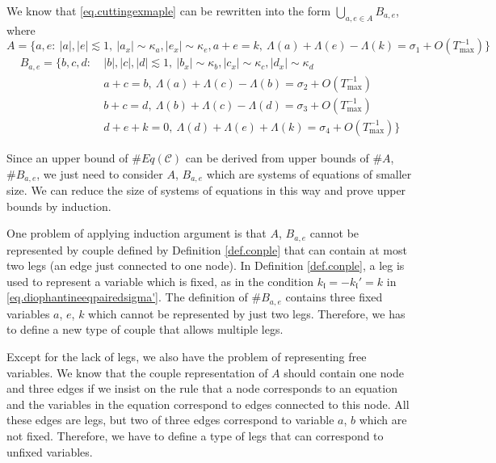 We know that \eqref{eq.cuttingexmaple} can be rewritten into the form $\bigcup_{a,e\in A} B_{a,e}$, where
\begin{equation}\label{eq.couplequationA}
    A=\{a, e:\ |a|,|e|\lesssim 1,\ |a_x|\sim \kappa_{a},|e_x|\sim \kappa_{e}, a+e=k,\ \Lambda(a) + \Lambda(e) - \Lambda(k) =\sigma_{1} + O(T^{-1}_{\text{max}})\}
\end{equation}
\begin{equation}\label{eq.couplequationB}
    \begin{split}
        B_{a,e}=\{b, c, d:\ &|b|,|c|,|d|\lesssim 1,\ |b_x|\sim \kappa_{b},|c_x|\sim \kappa_{c},|d_x|\sim \kappa_{d}
        \\
        &a+c=b,\ \Lambda(a) + \Lambda(c) - \Lambda(b) =\sigma_{2} + O(T^{-1}_{\text{max}})
        \\
        &b+c=d,\ \Lambda(b) + \Lambda(c) - \Lambda(d) =\sigma_{3} + O(T^{-1}_{\text{max}})
        \\
        &d+e+k=0,\ \Lambda(d) + \Lambda(e) + \Lambda(k) =\sigma_{4} + O(T^{-1}_{\text{max}})\}
    \end{split}    
\end{equation}

Since an upper bound of $\# Eq(\mathcal{C})$ can be derived from upper bounds of $\# A$, $\# B_{a,e}$, we just need to consider $A$, $B_{a,e}$ which are systems of equations of smaller size. We can reduce the size of systems of equations in this way and prove upper bounds by induction.

One problem of applying induction argument is that $A$, $B_{a,e}$ cannot be represented by couple defined by Definition \ref{def.conple} that can contain at most two legs (an edge just connected to one node). In Definition \ref{def.conple}, a leg is used to represent a variable which is fixed, as in the condition $k_{\mathfrak{l}} = - k_{\mathfrak{l}}'= k$ in \eqref{eq.diophantineeqpairedsigma'}. The definition of $\# B_{a,e}$ contains three fixed variables $a$, $e$, $k$ which cannot be represented by just two legs. Therefore, we has to define a new type of couple that allows multiple legs.

Except for the lack of legs, we also have the problem of representing free variables. We know that the couple representation of $A$ should contain one node and three edges if we insist on the rule that a node corresponds to an equation and the variables in the equation correspond to edges connected to this node. All these edges are legs, but two of three edges correspond to variable $a$, $b$ which are not fixed. Therefore, we have to define a type of legs that can correspond to unfixed variables.

